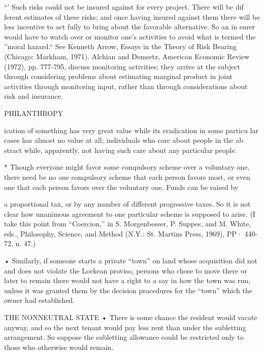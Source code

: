 \documentclass[11pt,openany]{book}
\begin{document}
{``' Such risks could not be insured against for every project. There will be dif ferent estimates of these risks; and once having insured against them there will be less incentive to act fully to bring about the favorable alternative. So an in surer would have to watch over or monitor one's activities to avoid what is termed the ''moral hazard.`` See Kenneth Arrow, Essays in the Theory of Risk Bearing (Chicago: Markham, 1971). Alchian and Demsetz, American Economic Review (1972), pp. 777-795, discuss monitoring activities; they arrive at the subject through considering problems about estimating marginal product in joint activities through monitoring input, rather than through considerations about risk and insurance.\par

PHILANTHROPY\par

ication of something has very great value while its eradication in some particu lar cases has almost no value at all; individuals who care about people in the ab stract while, apparently, not having such care about any particular people.\par

* Though everyone might favor some compulsory scheme over a voluntary one, there need be no one compulsory scheme that each person favors most, or even one that each person favors over the voluntary one. Funds can be raised by\par

a proportional tax, or by any number of different progressive taxes. So it is not clear how unanimous agreement to one particular scheme is supposed to arise. (I take this point from ``Coercion,'' in S. Morgenbesser, P. Suppes, and M. White, eds., Philosophy, Science, and Method (N.Y.: St. Martins Press, 1969), PP· 440-72, n. 47.)\par

• Similarly, if someone starts a private ``town'' on land whose acquisition did not and does not violate the Lockean proviso, persons who chose to move there or later to remain there would not have a right to a say in how the town was run, unless it was granted them by the decision procedures for the ``town'' which the owner had established.\par

THE NONNEUTRAL STATE • There is some chance the resident would vacate anyway, and so the next tenant would pay less rent than under the subletting arrangement. So suppose the subletting allowance could be restricted only to those who otherwise would remain.\par

}
\end{document}
